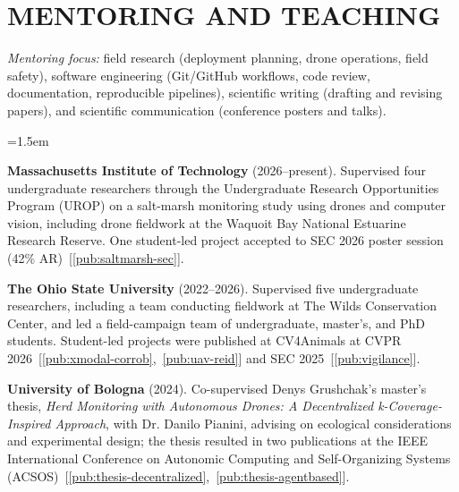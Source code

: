 \section{MENTORING AND TEACHING}

\smallskip{}\par\nobreak\vspace{2pt}
{\small\noindent \textit{Mentoring focus:} field research (deployment planning, drone operations, field safety), software engineering (Git/GitHub workflows, code review, documentation, reproducible pipelines), scientific writing (drafting and revising papers), and scientific communication (conference posters and talks).\par}\vspace{2pt}
{\leftskip=1.5em
{\small
\textbf{Massachusetts Institute of Technology} (2026--present). Supervised four undergraduate researchers through the Undergraduate Research Opportunities Program (UROP) on a salt-marsh monitoring study using drones and computer vision, including drone fieldwork at the Waquoit Bay National Estuarine Research Reserve. One student-led project accepted to SEC 2026 poster session (42\% AR)~[\ref{pub:saltmarsh-sec}].

\textbf{The Ohio State University} (2022--2026). Supervised five undergraduate researchers, including a team conducting fieldwork at The Wilds Conservation Center, and led a field-campaign team of undergraduate, master's, and PhD students. Student-led projects were published at CV4Animals at CVPR 2026~[\ref{pub:xmodal-corrob},~\ref{pub:uav-reid}] and SEC 2025~[\ref{pub:vigilance}].

\textbf{University of Bologna} (2024). Co-supervised Denys Grushchak's master's thesis, \textit{Herd Monitoring with Autonomous Drones: A Decentralized k-Coverage-Inspired Approach}, with Dr. Danilo Pianini, advising on ecological considerations and experimental design; the thesis resulted in two publications at the IEEE International Conference on Autonomic Computing and Self-Organizing Systems (ACSOS)~[\ref{pub:thesis-decentralized},~\ref{pub:thesis-agentbased}].
\par}
}

